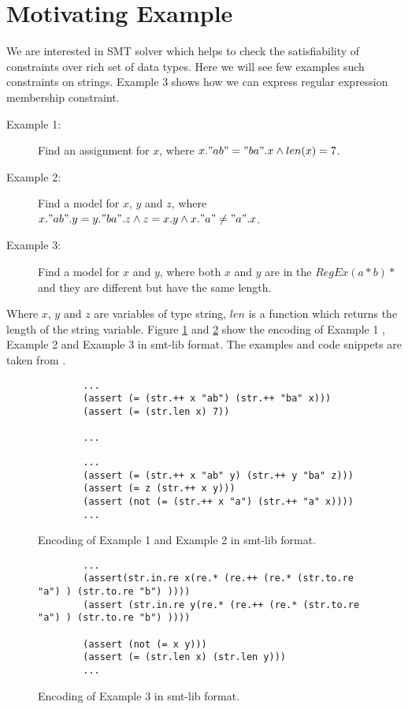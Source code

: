 \section{Motivating Example}
We are interested in SMT solver which helps to check the satisfiability of constraints over rich set of data types. Here we will see few examples such constraints on strings. Example 3 shows how we can express regular expression membership constraint.

\begin{description}
\item[Example  1: ] Find an assignment for \(x\), where \(x."ab"="ba".x \wedge  len(x) =7\).
\item[Example  2: ] Find a model for \(x\), \(y\) and \(z\), where \(x."ab".y=y."ba".z \wedge z=x.y \wedge x."a" \neq "a".x\).
\item[Example  3: ] Find a model for \(x\) and \(y\), where both \(x\) and \(y\) are in the \(RegEx (a*b)*\) and they are different but have the same length.
\end{description}
Where \(x\), \(y\) and \(z\) are variables of type string, \(len\) is a function which returns the length of the string variable.  Figure \ref{fig:smt_example_1_2} and \ref{fig:smt_example_3} show the encoding of Example 1 , Example 2 and Example 3 in smt-lib \cite{smtlib:website} format. The examples and code snippets  are taken from \cite{cvc4:wiki}.

\begin{figure}[ht]
	\centering
	\begin{minipage}[t]{0.45\linewidth}
		\begin{verbatim}
		...		
		(assert (= (str.++ x "ab") (str.++ "ba" x)))
		(assert (= (str.len x) 7))
		
		...
		\end{verbatim}
	\end{minipage}
	\quad
	\begin{minipage}[t]{0.45\linewidth}
		\begin{verbatim}
		...
		(assert (= (str.++ x "ab" y) (str.++ y "ba" z)))
		(assert (= z (str.++ x y)))
		(assert (not (= (str.++ x "a") (str.++ "a" x))))
		...
		\end{verbatim}
	\end{minipage}
	\caption{Encoding of Example 1 and Example 2 in smt-lib \cite{smtlib:website} format.}
	\label{fig:smt_example_1_2}
\end{figure}
\begin{figure}[ht]
	\centering
    \begin{minipage}[t]{0.65\linewidth}
		\begin{verbatim}
		...
		(assert(str.in.re x(re.* (re.++ (re.* (str.to.re "a") ) (str.to.re "b") ))))
		(assert (str.in.re y(re.* (re.++ (re.* (str.to.re "a") ) (str.to.re "b") ))))
		
		(assert (not (= x y)))
		(assert (= (str.len x) (str.len y)))
		...
		\end{verbatim}
	\end{minipage}
	\caption{Encoding of Example 3 in smt-lib \cite{smtlib:website} format.}
	\label{fig:smt_example_3}
\end{figure}

